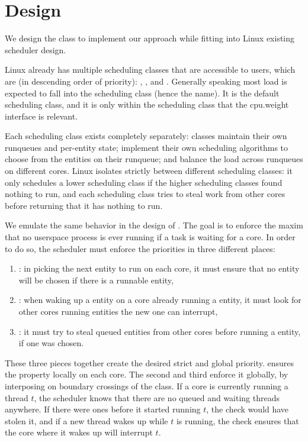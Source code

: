 \section{\beclass{} Design}\label{s:design}

We design the \beclass{} class to implement our approach while fitting into
Linux existing scheduler design.

Linux already has multiple scheduling classes that are accessible to users,
which are (in descending order of priority): \deadlineclass{}, \fifoclass{}, and
\normalclass{}. Generally speaking most load is expected to fall into the
\normalclass{} scheduling class (hence the name). It is the default scheduling
class, and it is only within the \normalclass{} scheduling class that the
\cgroups{} cpu.weight interface is relevant.

Each scheduling class exists completely separately:
classes maintain their own runqueues and per-entity state; implement their own
scheduling algorithms to choose from the entities on their runqueue; and balance
the load across runqueues on different cores. Linux isolates strictly between
different scheduling classes: it only schedules a lower scheduling class if the
higher scheduling classes found nothing to run, and each scheduling class tries
to steal work from other cores before returning that it has nothing to run. 

We emulate the same behavior in the design of \beclass{}. The goal is to enforce
the maxim that no \beclass{} userspace process is ever running if a
\normalclass{} task is waiting for a core. In order to do so, the scheduler must
enforce the priorities in three different places:
\begin{enumerate}
    \item \local: in picking the next entity to run on each core, it must ensure
        that no \beclass{} entity will be chosen if there is a runnable
        \normalclass{} entity,
    \item \entry: when waking up a \normalclass{} entity on a core already
        running a \normalclass{} entity, it must look for other cores running
        \beclass{} entities the new one can interrupt,
    \item \exit: it must try to steal queued \normalclass{} entities from other
        cores before running a \beclass{} entity, if one was chosen.
\end{enumerate}

These three pieces together create the desired strict and global priority.
\local{} ensures the property locally on each core. The second and third enforce
it globally, by interposing on boundary crossings of the \normalclass{} class.
If a core is currently running a \beclass{} thread $t$, the scheduler knows that
there are no queued and waiting \normalclass{} threads anywhere. If there were
ones before it started running $t$, the \exit{} check would have stolen it, and
if a new \normalclass{} thread wakes up while $t$ is running, the \entry{} check
ensures that the core where it wakes up will interrupt $t$.

